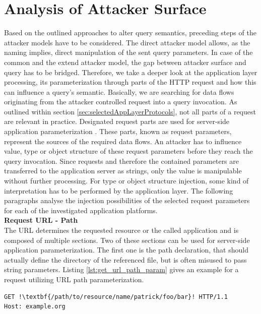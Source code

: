 \section{Analysis of Attacker Surface}
Based on the outlined approaches to alter query semantics, preceding steps of the attacker models have to be considered. The direct attacker model allows, as the naming implies, direct manipulation of the sent query parameters. In case of the common and the extend attacker model, the gap between attacker surface and query has to be bridged. Therefore, we take a deeper look at the application layer processing, its parameterization through parts of the HTTP request and how this can influence a query's semantic. Basically, we are searching for data flows originating from the attacker controlled request into a query invocation. As outlined within section \ref{sec:selectedAppLayerProtocols}, not all parts of a request are relevant in practice. Designated request parts are used for server-side application parameterization \cite{Zalewski:2011}. These parts, known as request parameters, represent the sources of the required data flows. An attacker has to influence value, type or object structure of these request parameters before they reach the query invocation. Since requests and therefore the contained parameters are transferred to the application server as strings, only the value is manipulable without further processing. For type or object structure injection, some kind of interpretation has to be performed by the application layer. The following paragraphs analyse the injection possibilities of the selected request parameters for each of the investigated application platforms. \\

\textbf{Request URL - Path}\\
The URL determines the requested resource or the called application and is composed of multiple sections. Two of these sections can be used for server-side application parameterization. The first one is the path declaration, that should actually define the directory of the referenced file, but is often misused to pass string parameters. Listing \ref{lst:get_url_path_param} gives an example for a request utilizing URL path parameterization. \\

\begin{lstlisting}[escapechar=!, caption={Example for GET request with URL path parameterization}, label={lst:get_url_path_param}]
GET !\textbf{/path/to/resource/name/patrick/foo/bar}! HTTP/1.1
Host: example.org
\end{lstlisting}

